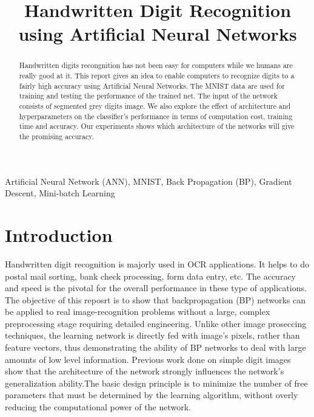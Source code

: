 \documentclass[conference]{IEEEtran}
\begin{document}
\title{Handwritten Digit Recognition using Artificial Neural Networks }



\author{
\and
{}

}

\maketitle

\begin{abstract}
Handwritten digits recongnition has not been easy for computers while we humans are really good at it. This report gives an idea to enable computers to recognize digits to a fairly high accuracy using Artificial Neural Networks. The MNIST data are used for training and testing the performance of the trained net. The input of the network consists of segmented grey digits image. We also explore the effect of architecture and hyperparameters on the classifier's performance in terms of computation cost, training time and accuracy. Our experiments shows which architecture of the networks will give the promising accuracy.
   
\end{abstract}

\begin{IEEEkeywords}

Artificial Neural Network (ANN), MNIST, Back Propagation (BP), Gradient Descent, Mini-batch Learning
\end{IEEEkeywords}

\section{Introduction}
Handwritten digit recognition is majorly used in OCR applications. It helps to do postal mail sorting, bank check processing, form data entry, etc. The accuracy and speed is the pivotal for the overall performance in these type of applications. The objective of this reposrt is to show that backpropagation (BP) networks can be applied to real image-recognition problems without a large, complex preprocessing stage requiring detailed engineering. Unlike other image proseccing techniques, the learning network is directly fed with image's pixels, rather than feature vectors, thus demonstrating the ability of BP networks to deal with large amounts of low level information. Previous work done on simple digit images show that the architecture of the network strongly influences the network's generalization ability.The basic design principle is to minimize the number 
of free parameters that must be determined by the learning algorithm, without overly reducing the computational power of the network. 
\end{document}
